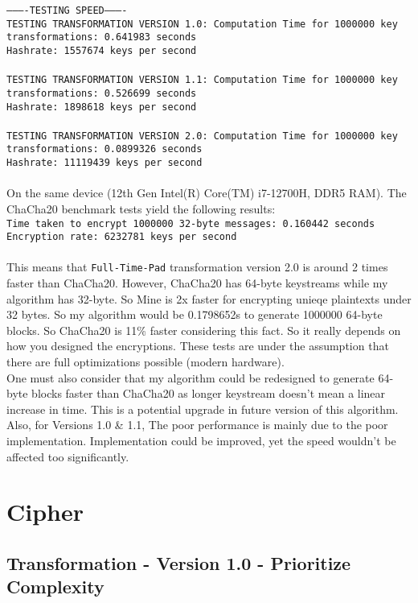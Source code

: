 \documentclass[fleqn, a4paper,12pt]{article}
\begin{document}
\texttt{----------TESTING SPEED----------\\
TESTING TRANSFORMATION VERSION 1.0: Computation Time for 1000000 key transformations: 0.641983 seconds\\
Hashrate: 1557674 keys per second\\
\\
TESTING TRANSFORMATION VERSION 1.1: Computation Time for 1000000 key transformations: 0.526699 seconds\\
Hashrate: 1898618 keys per second\\
\\
TESTING TRANSFORMATION VERSION 2.0: Computation Time for 1000000 key transformations: 0.0899326 seconds\\
Hashrate: 11119439 keys per second\\
}
\\
On the same device (12th Gen Intel(R) Core(TM) i7-12700H, DDR5 RAM). The ChaCha20 benchmark tests yield the following results:\\
\texttt{Time taken to encrypt 1000000 32-byte messages: 0.160442 seconds\\
Encryption rate: 6232781 keys per second}\\
\\
This means that \texttt{Full-Time-Pad} transformation version 2.0 is around 2 times faster than ChaCha20. However, ChaCha20 has 64-byte keystreams while my algorithm has 32-byte. So Mine is 2x faster for encrypting unieqe plaintexts under 32 bytes. So my algorithm would be 0.1798652s to generate 1000000 64-byte blocks. So ChaCha20 is 11\% faster considering this fact. So it really depends on how you designed the encryptions. These tests are under the assumption that there are full optimizations possible (modern hardware).
\\
One must also consider that my algorithm could be redesigned to generate 64-byte blocks faster than ChaCha20 as longer keystream doesn't mean a linear increase in time. This is a potential upgrade in future version of this algorithm.
\\
Also, for Versions 1.0 \& 1.1, The poor performance is mainly due to the poor implementation. Implementation could be improved, yet the speed wouldn't be affected too significantly.

\section {Cipher}

\subsection{Transformation - Version 1.0 - Prioritize Complexity}
\end{document}
